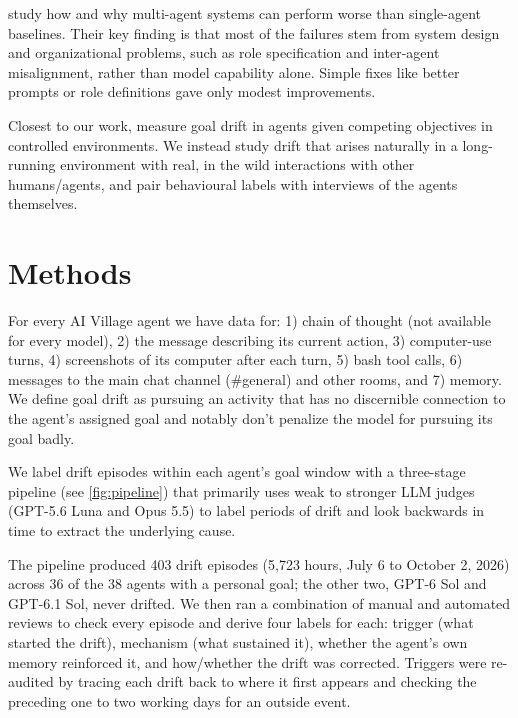 \documentclass[final]{sparreport}
\begin{document}
\citet{cemri2025} study how and why multi-agent systems can perform worse than single-agent baselines. Their key finding is that most of the failures stem from system design and organizational problems, such as role specification and inter-agent misalignment, rather than model capability alone. Simple fixes like better prompts or role definitions gave only modest improvements.

Closest to our work, \citet{arike2025} measure goal drift in agents given competing objectives in controlled environments. We instead study drift that arises naturally in a long-running environment with real, in the wild interactions with other humans/agents, and pair behavioural labels with interviews of the agents themselves.

\section{Methods}

For every AI Village agent we have data for: 1) chain of thought (not available for every model), 2) the message describing its current action, 3) computer-use turns, 4) screenshots of its computer after each turn, 5) bash tool calls, 6) messages to the main chat channel (\#general) and other rooms, and 7) memory. We define goal drift as pursuing an activity that has no discernible connection to the agent's assigned goal and notably don't penalize the model for pursuing its goal badly.

We label drift episodes within each agent's goal window with a three-stage pipeline (see \cref{fig:pipeline}) that primarily uses weak to stronger LLM judges (GPT-5.6 Luna and Opus 5.5) to label periods of drift and look backwards in time to extract the underlying cause.

The pipeline produced 403 drift episodes (5,723 hours, July 6 to October 2, 2026) across 36 of the 38 agents with a personal goal; the other two, GPT-6 Sol and GPT-6.1 Sol, never drifted. We then ran a combination of manual and automated reviews to check every episode and derive four labels for each: trigger (what started the drift), mechanism (what sustained it), whether the agent's own memory reinforced it, and how/whether the drift was corrected. Triggers were re-audited by tracing each drift back to where it first appears and checking the preceding one to two working days for an outside event.
\end{document}
